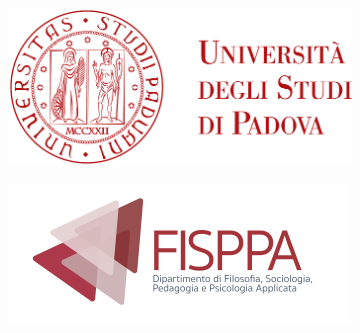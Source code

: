 \begin{titlepage}
        \begin{figure}
            \centering
            \begin{subfigure}[b]{0.4\textwidth}
                \includegraphics[width=\textwidth]{Immagini/logo_unipd}
            \end{subfigure}
            \hfill
            \begin{subfigure}[b]{0.3\textwidth}
                \includegraphics[width=\textwidth]{Immagini/logo.png}
            \end{subfigure}
        \end{figure}
    
    
        \begin{center}
            \makeatletter %

    

\end{center}
\end{titlepage}
